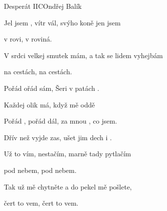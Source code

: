 \begin{song}{Desperát II}{C}{Ondřej Balík}
\begin{SBVerse}
Jel jsem , vítr vál, svýho koně jen jsem 

v rovi, v roviná. 

V srdci velkej smutek mám, a tak se lidem vyhejbám 

na cestách, na cestách. 
\end{SBVerse}
\begin{SBChorus}
Pořád ořád sám, Šeri v patách .

Každej olik má, když mě  oddě

Pořád , pořád dál, za mnou , co jsem.

Dřív než  vyjde zas, ušet jim dech i . 
\end{SBChorus}
\begin{SBVerse}
Už to vím, nestačím, marně tady pytlačím

pod nebem, pod nebem. 

Tak už mě chytněte a do pekel mě pošlete,

čert to vem, čert to vem.
\end{SBVerse}
\begin{SBChorus}
\end{SBChorus}
\end{song}
\pagebreak
